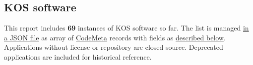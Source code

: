 \documentclass[
  DIV=10]{article}
\begin{document}
\newpage
{}
\recalctypearea

\subsection{KOS software}\label{kos-software}

This report includes \textbf{69} instances of KOS software so far. The
list is managed \href{kos-software.json}{in a JSON file} as array of
\href{https://codemeta.github.io/}{CodeMeta} records with fields as
\hyperref[metadata]{described below}. Applications without license or
repository are closed source. Deprecated applications are included for
historical reference.

\begin{longtable}[]{@{}lllllllll@{}}

\caption{\label{tbl-software}}

\tabularnewline


\end{longtable}
\end{document}
